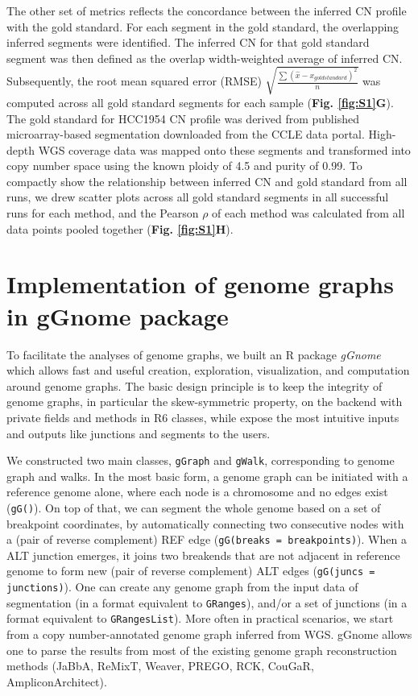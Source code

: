 \documentclass[phd,tocprelim]{cornell}
\begin{document}
The other set of metrics reflects the concordance between the inferred CN profile with the gold standard. For each segment in the gold standard, the overlapping inferred segments were identified. The inferred CN for that gold standard segment was then defined as the overlap width-weighted average of inferred CN. Subsequently, the root mean squared error (RMSE) $\sqrt{\frac{\sum{(\hat{x} - x_{goldstandard})^2}}{n}}$ was computed across all gold standard segments for each sample (\textbf{Fig. \ref{fig:S1}G}). The gold standard for HCC1954 CN profile was derived from published microarray-based segmentation downloaded from the CCLE data portal. High-depth WGS coverage data was mapped onto these segments and transformed into copy number space using the known ploidy of 4.5 and purity of 0.99. To compactly show the relationship between inferred CN and gold standard from all runs, we drew scatter plots across all gold standard segments in all successful runs for each method, and the Pearson $\rho$ of each method was calculated from all data points pooled together (\textbf{Fig. \ref{fig:S1}H}).

\section{Implementation of genome graphs in gGnome package} \label{sec:implement_ggnome}
To facilitate the analyses of genome graphs, we built an R package \textit{gGnome} which allows fast and useful creation, exploration, visualization, and computation around genome graphs. The basic design principle is to keep the integrity of genome graphs, in particular the skew-symmetric property, on the backend with private fields and methods in R6 classes, while expose the most intuitive inputs and outputs like junctions and segments to the users.

We constructed two main classes, \texttt{gGraph} and \texttt{gWalk}, corresponding to genome graph and walks. In the most basic form, a genome graph can be initiated with a reference genome alone, where each node is a chromosome and no edges exist (\texttt{gG()}). On top of that, we can segment the whole genome based on a set of breakpoint coordinates, by automatically connecting two consecutive nodes with a (pair of reverse complement) REF edge (\texttt{gG(breaks = breakpoints)}). When a ALT junction emerges, it joins two breakends that are not adjacent in reference genome to form new (pair of reverse complement) ALT edges (\texttt{gG(juncs = junctions)}). One can create any genome graph from the input data of segmentation (in a format equivalent to \texttt{GRanges}), and/or a set of junctions (in a format equivalent to \texttt{GRangesList}). More often in practical scenarios, we start from a copy number-annotated genome graph inferred from WGS. gGnome allows one to parse the results from most of the existing genome graph reconstruction methods (JaBbA, ReMixT, Weaver, PREGO, RCK, CouGaR, AmpliconArchitect).
\end{document}

